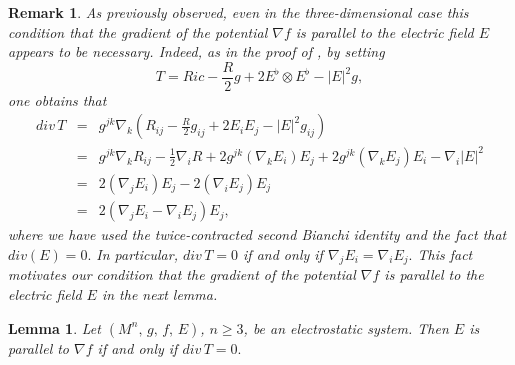 \documentclass{amsart}
\newtheorem{lemma}{Lemma}
\newtheorem{remark}{Remark}
\numberwithin{equation}{section}
\begin{document}
\begin{remark}
\label{remarkNEW} 
As previously observed, even in the three-dimensional case this condition that the gradient of the potential \(\nabla f\) is parallel to the electric field $E$ appears to be necessary. Indeed, as in the proof of \cite[Proposition~21]{tiarlos}, by setting 
\begin{equation}
\label{tensorTT}
T=Ric-\frac{R}{2}g + 2E^\flat\otimes E^{\flat}-|E|^2 g,
\end{equation} one obtains that  
\begin{eqnarray}
div\,T &=& g^{jk}\nabla_{k}\left(R_{ij}-\frac{R}{2}g_{ij}+2E_{i}E_{j}-|E|^2 g_{ij}\right)\nonumber\\&=& g^{jk}\nabla_{k}R_{ij}-\frac{1}{2}\nabla_{i}R+2g^{jk}(\nabla_{k}E_{i})E_{j}+2g^{jk}(\nabla_{k}E_{j})E_{i}-\nabla_{i}|E|^2\nonumber\\&=& 2(\nabla_{j}E_{i})E_{j}-2(\nabla_{i}E_{j})E_{j}\nonumber\\&=&2(\nabla_{j}E_{i}-\nabla_{i}E_{j})E_{j},
\end{eqnarray} where we have used the twice-contracted second Bianchi identity and the fact that $div(E)=0.$ In particular, $div\,T=0$ if and only if $\nabla_{j}E_{i}=\nabla_{i}E_{j}.$ This fact motivates our condition that the gradient of the potential \(\nabla f\) is parallel to the electric field $E$ in the next lemma. 
\end{remark}
	
 

	\begin{lemma}\label{theo0}
		Let $(M^n,\,g,\,f,\,E)$, $n\geq3$, be an electrostatic system. Then $E$ is parallel to $\nabla f$ if and only if $div\, T=0.$
	\end{lemma}
	
	
\end{document}
